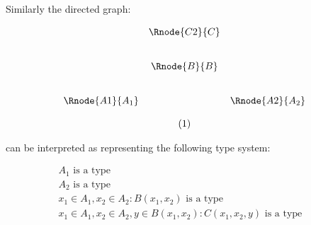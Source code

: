 \begin{frame}
Similarly the directed graph:

\begin{center}
$
\begin{array}{p{1.5cm}cccp{2cm}c}
&                & \Rnode{C2}{C}&   \\ [0.8cm]
&                & \Rnode{B}{B} &  \\ [0.8cm]
&\Rnode{A1}{A_1} &              & \Rnode{A2}{A_2}\\ [0.4cm]
&                &\stepcounter{equation}(\theequation) &  \\
\end{array}
$
\setlength {\saroffsetA}{-2pt}
\setlength {\saroffsetB}{-2pt}
\setlength {\saroffsetA}{2pt}
\setlength {\saroffsetB}{2pt}
\sarreset
{}
\end{center}

\noindent can be interpreted as representing the following type system:

\addtocounter{equation}{-1}
\begin{align}
&A_1\mbox{ is a type} && \tag*{(\theequation a)}\\
&A_2\mbox{ is a type} && \tag*{(\theequation b)}\\
&x_1\in A_1, x_2 \in A_2 : B(x_1,x_2) \mbox{ is a type} && \tag*{(\theequation c)}\\
&x_1\in A_1, x_2 \in A_2, y \in B(x_1,x_2): C(x_1,x_2,y) \mbox{ is a type} && \tag*{(\theequation d)}\\
\end{align}
\end{frame}

